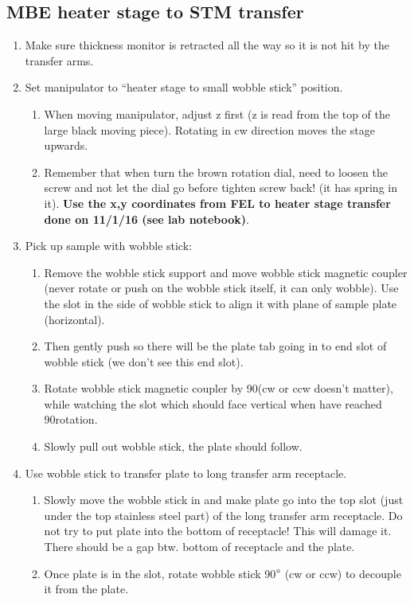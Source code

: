 \subsection{MBE heater stage to STM transfer}
\begin{enumerate}
	\item	Make sure thickness monitor is retracted all the way so it is not hit by the transfer arms.
     \item Set manipulator to “heater stage to small wobble stick” position.
	\begin{enumerate}
	\item	When moving manipulator, adjust z first (z is read from the top of the large black moving piece).  Rotating in cw direction moves the stage upwards.
	\item	Remember that when turn the brown rotation dial, need to loosen the screw and not let the dial go before tighten screw back! (it has spring in it). \textbf{Use the x,y coordinates from FEL to heater stage transfer done on 11/1/16 (see lab notebook)}.
	\end{enumerate}
	\item	Pick up sample with wobble stick: 
	\begin{enumerate}
	\item	Remove the wobble stick support and move wobble stick magnetic coupler (never rotate or push on the wobble stick itself, it can only wobble).  Use the slot in the side of wobble stick to align it with plane of sample plate (horizontal). 
	\item	Then gently push so there will be the plate tab going in to end slot of wobble stick (we don’t see this end slot). 
	\item	Rotate wobble stick magnetic coupler by 90\degree (cw or ccw doesn’t matter), while watching the slot which should face vertical when have reached 90\degree rotation.
	\item	Slowly pull out wobble stick, the plate should follow.
	\end{enumerate}
\item	Use wobble stick to transfer plate to long transfer arm receptacle. 
\begin{enumerate}
	\item	Slowly move the wobble stick in and make plate go into the top slot (just under the top stainless steel part) of the long transfer arm receptacle. Do not try to put plate into the bottom of receptacle! This will damage it. There should be a gap btw. bottom of receptacle and the plate. 
	\item	Once plate is in the slot, rotate wobble stick 90$\degree$ (cw or ccw) to decouple it from the plate. 

\end{enumerate}
\end{enumerate}
